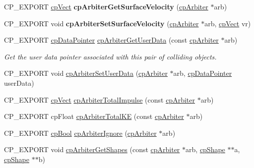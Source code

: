\begin{DoxyCompactItemize}
\mbox{\label{group__cpArbiter_gaede8b70f4bb8e5f1e74eaffa210f3824}} 
C\+P\+\_\+\+E\+X\+P\+O\+RT \hyperlink{structcpVect}{cp\+Vect} {\bfseries cp\+Arbiter\+Get\+Surface\+Velocity} (\hyperlink{structcpArbiter}{cp\+Arbiter} $\ast$arb)
\item 
\mbox{\label{group__cpArbiter_ga71e72c2b8ec0770a2cb2c8d423fce42b}} 
C\+P\+\_\+\+E\+X\+P\+O\+RT void {\bfseries cp\+Arbiter\+Set\+Surface\+Velocity} (\hyperlink{structcpArbiter}{cp\+Arbiter} $\ast$arb, \hyperlink{structcpVect}{cp\+Vect} vr)
\item 
\mbox{\label{group__cpArbiter_ga97ebdb266ac42a9d10169374c233865d}} 
C\+P\+\_\+\+E\+X\+P\+O\+RT \hyperlink{group__basicTypes_ga2ac2c3c31e21893941f9e4f8ee279447}{cp\+Data\+Pointer} \hyperlink{group__cpArbiter_ga97ebdb266ac42a9d10169374c233865d}{cp\+Arbiter\+Get\+User\+Data} (const \hyperlink{structcpArbiter}{cp\+Arbiter} $\ast$arb)
\begin{DoxyCompactList}\small\item\em Get the user data pointer associated with this pair of colliding objects. \end{DoxyCompactList}\item 
C\+P\+\_\+\+E\+X\+P\+O\+RT void \hyperlink{group__cpArbiter_gafb92e7ea05fb11021ce3f01ff4baa067}{cp\+Arbiter\+Set\+User\+Data} (\hyperlink{structcpArbiter}{cp\+Arbiter} $\ast$arb, \hyperlink{group__basicTypes_ga2ac2c3c31e21893941f9e4f8ee279447}{cp\+Data\+Pointer} user\+Data)
\item 
C\+P\+\_\+\+E\+X\+P\+O\+RT \hyperlink{structcpVect}{cp\+Vect} \hyperlink{group__cpArbiter_ga7dcf707be34b3ecddba4d61ff9d11415}{cp\+Arbiter\+Total\+Impulse} (const \hyperlink{structcpArbiter}{cp\+Arbiter} $\ast$arb)
\item 
C\+P\+\_\+\+E\+X\+P\+O\+RT cp\+Float \hyperlink{group__cpArbiter_ga9918019bc0e4af5a2618e0ddeec4d64c}{cp\+Arbiter\+Total\+KE} (const \hyperlink{structcpArbiter}{cp\+Arbiter} $\ast$arb)
\item 
C\+P\+\_\+\+E\+X\+P\+O\+RT \hyperlink{group__basicTypes_gabc5e752c48f3449ca26ef413ecbd647e}{cp\+Bool} \hyperlink{group__cpArbiter_ga7a643cd465bdb61b2f686fdf3558b263}{cp\+Arbiter\+Ignore} (\hyperlink{structcpArbiter}{cp\+Arbiter} $\ast$arb)
\item 
C\+P\+\_\+\+E\+X\+P\+O\+RT void \hyperlink{group__cpArbiter_ga521ac495c53bf25ab061a79643bb195a}{cp\+Arbiter\+Get\+Shapes} (const \hyperlink{structcpArbiter}{cp\+Arbiter} $\ast$arb, \hyperlink{structcpShape}{cp\+Shape} $\ast$$\ast$a, \hyperlink{structcpShape}{cp\+Shape} $\ast$$\ast$b)

\end{DoxyCompactItemize}
